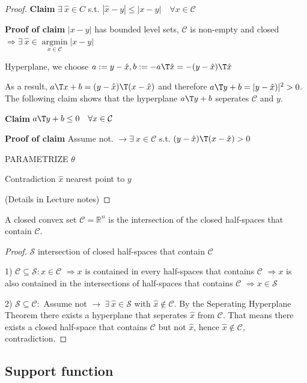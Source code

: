 \begin{proof}
	\textbf{Claim}
	$\exists\ \hat{x} \in C$ s.t. $|\hat{x}-y|\leq |x-y|\quad \forall x \in \mathcal{C}$

	\textbf{Proof of claim}
	$|x-y|$ has bounded level sets,
	$\mathcal{C}$ is non-empty and closed
	$\Rightarrow \exists\ \hat{x} \in \underset{x \in \mathcal{C}}{\operatorname{argmin}}|x-y|$

	Hyperplane, we choose $a:=y-\hat{x}, b:=-a\T\hat{x} = -(y-\hat{x})\T\hat{x}$

	As a result, $a\T x + b = (y-\hat{x})\T (x-\hat{x})$
	and therefore $a\T y + b = |y-\hat{x})|^2 > 0$.
	The following claim shows that the hyperplane $a\T y + b$ seperates $\mathcal{C}$ and $y$.


	\textbf{Claim}
	$a\T y + b \le 0\quad \forall x \in \mathcal{C}$

	\textbf{Proof of claim}
	Assume not.
	$\rightarrow \exists\ x \in \mathcal{C}$ s.t.
	$(y-\hat{x})\T (x-\hat{x}) > 0$

	PARAMETRIZE $\theta$

	Contradiction $\hat{x}$ nearest point to $y$

	(Details in Lecture notes)
\end{proof}

\begin{corollary}
	A closed convex set $\mathcal{C} = \mathbb{R}^n$
	is the intersection of the closed half-spaces
	that contain $\mathcal{C}$.
\end{corollary}

\begin{proof}
	$\mathcal{S}$ intersection of closed half-spaces that contain $\mathcal{C}$

	1) $\mathcal{C} \subseteq \mathcal{S}: x \in \mathcal{C}$
	$\Rightarrow x$ is contained in every half-spaces that contains $\mathcal{C}$
	$\Rightarrow x$ is also contained in the intersections of half-spaces that contains $\mathcal{C}$
	$\Rightarrow x \in \mathcal{S}$

	2) $\mathcal{S} \subseteq \mathcal{C}:$
	Assume not
	$\rightarrow\ \exists\ \hat{x}\in \mathcal{S}$
	with $\hat{x}\notin \mathcal{C}$.
	By the Seperating Hyperplane Theorem there exists a hyperplane
	that seperates $\hat{x}$ from $\mathcal{C}$.
	That means there exists a closed half-space
	that contains $\mathcal{C}$ but not $\hat{x}$,
	hence $\hat{x}\notin \mathcal{C}$, contradiction.
\end{proof}

\subsection{Support function}

